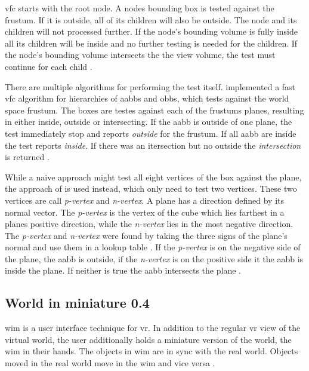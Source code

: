 \gls{vfc} starts with the root node. A nodes bounding box is tested against the frustum. If it is outside, all of its children will also be outside. The node and its children will not processed further. If the node's bounding volume is fully inside all its children will be inside and no further testing is needed for the children. If the node's bounding volume intersects the the view volume, the test must continue for each child \cite{akine:2018:realtime}.

There are multiple algorithms for performing the test itself. \textcite{assarsson:2000:optimized} implemented a fast \gls{vfc} algorithm for hierarchies of \glspl{aabb} and \glspl{obb}, which tests against the world space frustum. The boxes are testes against each of the frustums planes, resulting in either inside, outside or intersecting. If the \gls{aabb} is outside of one plane, the test immediately stop and reports \textit{outside} for the frustum. If all \gls{aabb} are inside the test reports \textit{inside}. If there was an itersection but no outside the \textit{intersection} is returned \cite{assarsson:2000:optimized}.

While a naive approach might test all eight vertices of the box against the plane, the approach of \textcite{greene:1994:detecting} is used instead, which only need to test two vertices. These two vertices are call  \textit{p-vertex} and \textit{n-vertex}. A plane has a direction defined by its normal vector. The \textit{p-vertex} is the vertex of the cube which lies farthest in a planes positive direction, while the \textit{n-vertex} lies in the most negative direction. The \textit{p-vertex} and \textit{n-vertex} were found by taking the three signs of the plane's normal and use them in a lookup table \cite{assarsson:2000:optimized}. If the \textit{p-vertex} is on the negative side of the plane, the \gls{aabb} is outside, if the \textit{n-vertex} is on the positive side it the \gls{aabb} is inside the plane. If neither is true the \gls{aabb} intersects the plane \cite{greene:1994:detecting}.


\subsection{World in miniature 0.4}
\Gls{wim} is a user interface technique for \gls{vr}. In addition to the regular \gls{vr} view of the virtual world, the user additionally holds a miniature version of the world, the \gls{wim} in their hands. The objects in \gls{wim} are in sync with the real world. Objects moved in the real world move in the  \gls{wim} and vice versa \cite{stoakley:1995:virtual}. 

